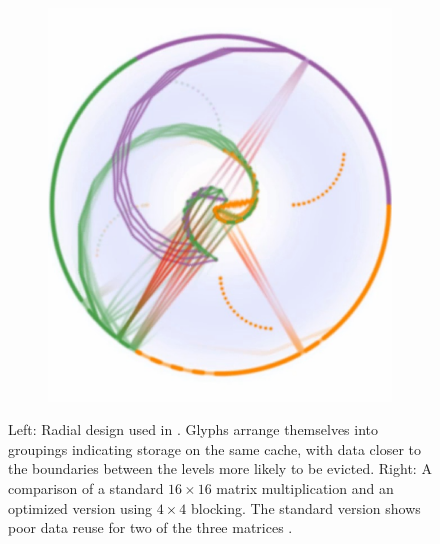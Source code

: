 \begin{figure}
\begin{subfigure}[c]{.24\linewidth}
	\end{subfigure}
	\begin{subfigure}[c]{.24\linewidth}
		\centering
		\includegraphics[width=\linewidth]{pictures/abstract_optimized.png}
	\end{subfigure}
	\caption{Left: Radial design used in \cite{choudhury2011abstract}. Glyphs arrange themselves into groupings indicating storage on the same cache, with data closer to the boundaries between the levels more likely to be evicted. Right: A comparison of a standard $16 \times 16$ matrix multiplication and an optimized version using $4 \times 4$ blocking. The standard version shows poor data reuse for two of the three matrices \cite{choudhury2011abstract}.}
	\label{fig:abstract_cache}
\end{figure}


